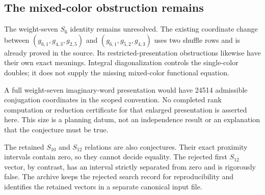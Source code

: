\subsection{The mixed-color obstruction remains}

The weight-seven $S_6$ identity remains unresolved. The existing
coordinate change between $(g_{6,1},g_{4,3},g_{2,5})$ and
$(g_{6,1},g_{5,2},g_{4,3})$ uses two shuffle rows and is already proved
in the source. Its restricted-presentation obstructions likewise have
their own exact meanings. Integral diagonalization controls the
single-color doubles; it does not supply the missing mixed-color
functional equation.

A full weight-seven imaginary-word presentation would have 24514
admissible conjugation coordinates in the scoped convention. No
completed rank computation or reduction certificate for that enlarged
presentation is asserted here. This size is a planning datum, not an
independence result or an explanation that the conjecture must be true.

The retained $S_{10}$ and $S_{12}$ relations are also conjectures.
Their exact proximity intervals contain zero, so they cannot decide
equality. The rejected first $S_{12}$ vector, by contrast, has an interval
strictly separated from zero and is rigorously false. The archive keeps
the rejected search record for reproducibility and identifies the
retained vectors in a separate canonical input file.
